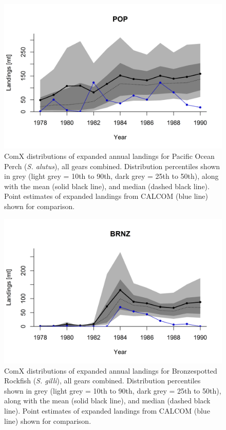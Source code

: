 \documentclass[12pt]{article}
\begin{document}
%
\clearpage
%

\begin{landscape}
\begin{figure}
\centering
\vspace{-2cm}
\includegraphics[width=1.3\textwidth]{./pictures/sp-yr/POP.png}
\caption{ComX distributions of expanded annual landings for Pacific Ocean Perch 
(\textit{S. alutus}), all gears combined. Distribution percentiles shown in grey 
(light grey = 10th to 90th, dark grey = 25th to 50th), along with the mean 
(solid black line), and median (dashed black line). Point estimates of 
expanded landings from CALCOM (blue line) shown for comparison.}
\label{Y11}
\end{figure}
\end{landscape}

%
\clearpage
%

\begin{landscape}
\begin{figure}
\centering
\vspace{-2cm}
\includegraphics[width=1.3\textwidth]{./pictures/sp-yr/BRNZ.png}
\caption{ComX distributions of expanded annual landings for Bronzespotted Rockfish 
(\textit{S. gilli}), all gears combined. Distribution percentiles shown in grey 
(light grey = 10th to 90th, dark grey = 25th to 50th), along with the mean 
(solid black line), and median (dashed black line). Point estimates of 
expanded landings from CALCOM (blue line) shown for comparison.}
\label{Y12}
\end{figure}
\end{landscape}
\end{document}
